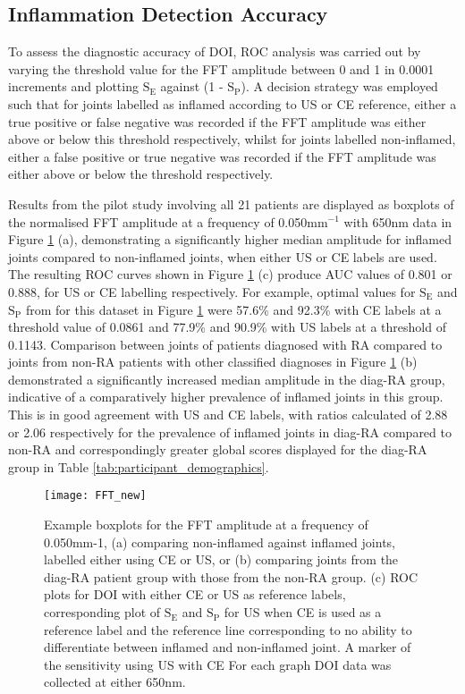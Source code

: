 \documentclass[twoside]{bhamthesis}
\theoremstyle{definition}
\begin{document}
\subsection{Inflammation Detection Accuracy}

To assess the diagnostic accuracy of DOI, ROC analysis was carried out by varying the threshold value for the FFT amplitude between 0 and 1 in 0.0001 increments and plotting $\mathrm{S_E}$ against (1 - $\mathrm{S_P}$). A decision strategy was employed such that for joints labelled as inflamed according to US or CE reference, either a true positive or false negative was recorded if the FFT amplitude was either above or below this threshold respectively, whilst for joints labelled non-inflamed, either a false positive or true negative was recorded if the FFT amplitude was either above or below the threshold respectively.

Results from the pilot study involving all 21 patients are displayed as boxplots of the normalised FFT amplitude at a frequency of 0.050mm$^{-1}$ with 650nm data in Figure \ref{fig:ROC_CURVES} (a), demonstrating a significantly higher median amplitude for inflamed joints compared to non-inflamed joints, when either US or CE labels are used. The resulting ROC curves shown in Figure \ref{fig:ROC_CURVES} (c) produce AUC values of  0.801 or 0.888, for US or CE labelling respectively. For example, optimal values for $\mathrm{S_E}$ and $\mathrm{S_P}$ from for this dataset in Figure \ref{fig:ROC_CURVES} were 57.6\% and 92.3\% with CE labels at a threshold value of 0.0861 and 77.9\% and 90.9\% with US labels at a threshold of 0.1143. Comparison between joints of patients diagnosed with RA compared to joints from non-RA patients with other classified diagnoses in Figure \ref{fig:ROC_CURVES} (b) demonstrated a significantly increased median amplitude in the diag-RA group, indicative of a comparatively higher prevalence of inflamed joints in this group. This is in good agreement with US and CE labels, with ratios calculated of 2.88 or 2.06 respectively for the prevalence of inflamed joints in diag-RA compared to non-RA and correspondingly greater global scores displayed for the diag-RA group in Table 
\ref{tab:participant_demographics}.

\begin{figure}[!ht]
\centering\texttt{[image: FFT\_new]}\caption{Example boxplots for the FFT amplitude at a frequency of 0.050mm-1, (a) comparing non-inflamed against inflamed joints, labelled either using CE or US, or (b) comparing joints from the diag-RA patient group with those from the non-RA group. (c) ROC plots for DOI with either CE or US as reference labels, corresponding plot of $\mathrm{S_E}$ and $\mathrm{S_P}$ for US when CE is used as a reference label and the reference line corresponding to no ability to differentiate between inflamed and non-inflamed joint. A marker of the sensitivity using US with CE For each graph DOI data was collected at either 650nm.}
\label{fig:ROC_CURVES}
\end{figure}
\end{document}
